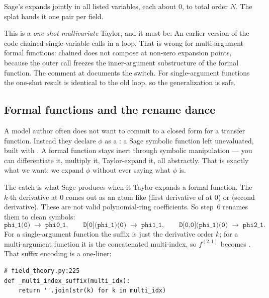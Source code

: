 Sage's  expands  jointly in
all listed variables, each about $0$, to total order $N$. The \code{*[(v, 0) for
...]} splat hands it one  pair per field.

\begin{gotcha}
This is a \emph{one-shot multivariate} Taylor, and it must be. An earlier version
of the code chained single-variable  calls in a loop. That is wrong
for multi-argument formal functions: chained  does not compose at
non-zero expansion points, because the outer call freezes the inner-argument
substructure of the formal function. The comment at 
documents the switch. For single-argument functions the one-shot result is identical
to the old loop, so the generalization is safe.
\end{gotcha}

\subsection{Formal functions and the rename dance}\label{sec:formal}

A model author often does not want to commit to a closed form for a transfer
function. Instead they declare $\phi$ as a : a Sage symbolic
function left unevaluated, built with . A formal
function stays inert through symbolic manipulation --- you can differentiate it,
multiply it, Taylor-expand it, all abstractly. That is exactly what we want: we
expand $\phi$ without ever saying what $\phi$ is.

The catch is what Sage produces when it Taylor-expands a formal function. The
$k$-th derivative at $0$ comes out as an atom like  (first
derivative of  at $0$) or  (second
derivative). These are not valid polynomial-ring coefficients. So step~6 renames
them to clean symbols:
\[
  \texttt{phi\_1(0)} \;\to\; \texttt{phi0\_1}, \qquad
  \texttt{D[0](phi\_1)(0)} \;\to\; \texttt{phi1\_1}, \qquad
  \texttt{D[0,0](phi\_1)(0)} \;\to\; \texttt{phi2\_1}.
\]
For a single-argument function the suffix is just the derivative order $k$; for a
multi-argument function it is the concatenated multi-index, so $f^{(2,1)}$ becomes
. That suffix encoding is a one-liner:

\begin{lstlisting}
# field_theory.py:225
def _multi_index_suffix(multi_idx):
    return ''.join(str(k) for k in multi_idx)
\end{lstlisting}

